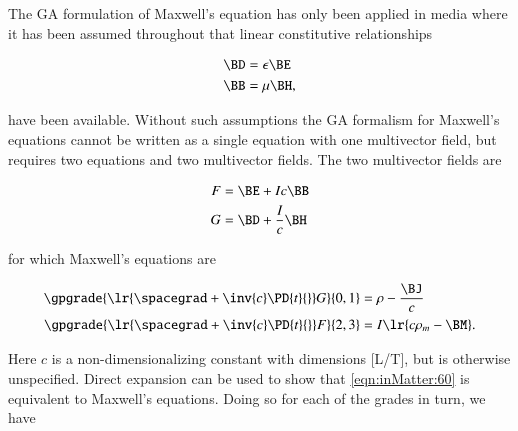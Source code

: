 %
%
The GA formulation of Maxwell's equation has only been applied in media where it has been assumed throughout that linear constitutive relationships

\begin{dmath}\label{eqn:inMatter:20}
\begin{aligned}
\BD &= \epsilon \BE \\
\BB &= \mu \BH,
\end{aligned}
\end{dmath}

have been available.  Without such assumptions the GA formalism for Maxwell's equations cannot be written as a single equation with one multivector field, but requires two equations and two multivector fields.  The two multivector fields are

\begin{dmath}\label{eqn:inMatter:40}
\begin{aligned}
F &= \BE + I c \BB \\
G &= \BD + \frac{I}{c} \BH
\end{aligned}
\end{dmath}

for which Maxwell's equations are

\begin{dmath}\label{eqn:inMatter:60}
\begin{aligned}
\gpgrade{ \lr{ \spacegrad + \inv{c} \PD{t}{} } G }{0,1} &= \rho - \frac{\BJ}{c} \\
\gpgrade{ \lr{ \spacegrad + \inv{c} \PD{t}{} } F }{2,3} &= I \lr{ c \rho_m - \BM }.
\end{aligned}
\end{dmath}

Here \( c \) is a non-dimensionalizing constant with dimensions [L/T], but is otherwise unspecified.
Direct expansion can be used to show that \cref{eqn:inMatter:60} is equivalent to Maxwell's equations.
Doing so for each of the grades in turn, we have

